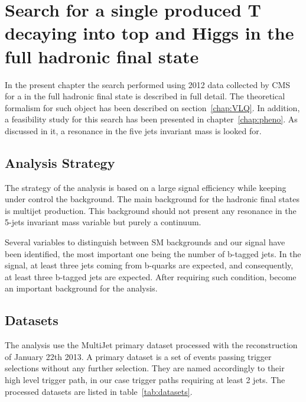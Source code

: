 \chapter[Single VLQ search]{Search for a single produced T decaying into top and Higgs in the full hadronic final state}
\label{chap:search}

In the present chapter the search performed using 2012 data collected by CMS for a \Tp in the full hadronic final state is described in full detail. The theoretical formalism for such object has been described on section~\ref{chap:VLQ}. In addition, a feasibility study for this search has been presented in chapter~\ref{chap:pheno}. As discussed in it, a resonance in the five jets invariant mass is looked for.

\section{Analysis Strategy}
\label{sec:stra}

The strategy of the analysis is based on a large signal efficiency while keeping under control the background. The main background for the hadronic final states is multijet production. This background should not present any resonance in the 5-jets invariant mass variable but purely a continuum. %

Several variables to distinguish between SM backgrounds and our signal have been identified, the most important one being the number of b-tagged jets. In the signal, at least three jets coming from b-quarks are expected, and consequently, at least three b-tagged jets are expected. After requiring such condition, \ttbar become an important background for the analysis. %

\section{Datasets}
\label{sec:data}

The analysis use the MultiJet primary dataset processed with the reconstruction of January 22th 2013. A primary dataset is a set of events passing trigger selections without any further selection. They are named accordingly to their high level trigger path, in our case trigger paths requiring at least 2 jets. The processed datasets are listed in table~\ref{tab:datasets}.

